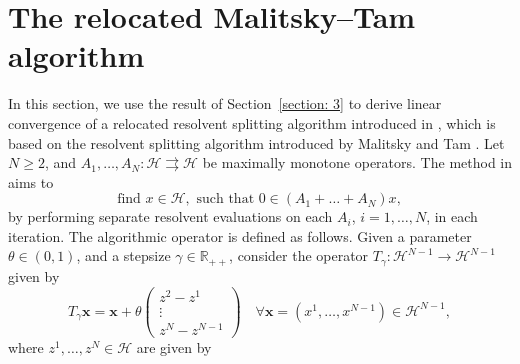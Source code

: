 \documentclass[a4paper,12pt]{article}
\newcommand{\setto}{\rightrightarrows}
\begin{document}
\section{The relocated Malitsky--Tam algorithm} \label{s:MT}
In this section, we use the result of Section~\ref{section: 3} to derive linear convergence of a relocated resolvent splitting algorithm introduced in \cite{atenas2025relocated}, which is based on the resolvent splitting algorithm introduced by Malitsky and Tam \cite{malitsky2023resolvent}. Let $N\geq 2$, and $A_1, \dots, A_N: \mathcal{H} \setto \mathcal{H}$ be maximally monotone operators. The method in \cite{malitsky2023resolvent} aims to \begin{equation*}
    \text{find~} x\in \mathcal{H}, \text{~such that~} 0 \in (A_1 + \dots + A_N)x,
\end{equation*} by performing separate resolvent evaluations on each $A_i$, $i=1, \dots, N$, in each iteration. The algorithmic operator is defined as follows. Given a parameter $\theta \in (0,1)$, and a stepsize $\gamma\in\mathbb{R}_{++}$, consider the operator $T_\gamma:\mathcal{H}^{N-1}\rightarrow\mathcal{H}^{N-1}$ given by\begin{equation}\label{operator of MT}
        T_\gamma \mathbf{x}=\mathbf{x}+\theta\begin{pmatrix}
        z^2-z^1\\\vdots\\z^N-z^{N-1}
    \end{pmatrix} \quad \forall \mathbf{x} = (x^1, \dots, x^{N-1})\in \mathcal{H}^{N-1},
    \end{equation}
    where $z^1,\dots,z^N\in\mathcal{H}$ are given by
\end{document}
